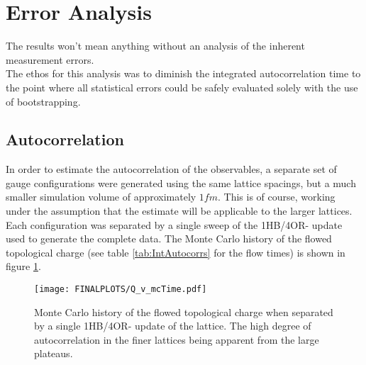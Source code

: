 \documentclass[a4paper,10pt]{book}
\begin{document}
\section{Error Analysis}
The results won't mean anything without an analysis of the inherent measurement errors.\\The ethos for this analysis was to diminish the integrated autocorrelation time to the point where all statistical errors could be safely evaluated solely with the use of bootstrapping. 
\subsection{Autocorrelation}\label{sec:autoCorr_analysis}
In order to estimate the autocorrelation of the observables, a separate set of gauge configurations were generated using the same lattice spacings, but a much smaller simulation volume of approximately $1fm$. This is of course, working under the assumption that the estimate will be applicable to the larger lattices.\\Each configuration was separated by a single sweep of the 1HB/4OR- update used to generate the complete data. The Monte Carlo history of the flowed topological charge (see table \ref{tab:IntAutocorrs} for the flow times) is shown in figure \ref{fig:MC-historyQ}.\\
\begin{figure}[htbp]
\centering
\texttt{[image: FINALPLOTS/Q\_v\_mcTime.pdf]}
\caption[Monte Carlo history of the flowed topological charge]{Monte Carlo history of the flowed topological charge when separated by a single 1HB/4OR- update of the lattice. The high degree of autocorrelation in the finer lattices being apparent from the large plateaus.}\label{fig:MC-historyQ}
\end{figure}
\end{document}
